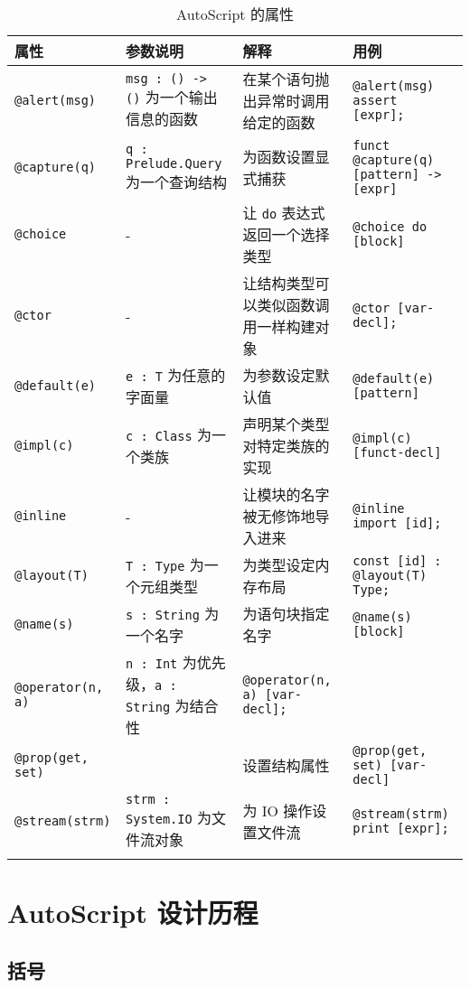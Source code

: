 \begin{longtable}{l p{4cm} p{3cm} p{4cm}} \hline
		属性 & 参数说明 & 解释 & 用例 \\\hline
		\lstinline!@alert(msg)! & \lstinline!msg : () -> ()! 为一个输出信息的函数 & 在某个语句抛出异常时调用给定的函数 & \lstinline!@alert(msg) assert [expr];! \\\hline
		\lstinline!@capture(q)! & \lstinline!q : Prelude.Query! 为一个查询结构 & 为函数设置显式捕获 & \lstinline!funct @capture(q) [pattern] -> [expr]! \\\hline
		\lstinline!@choice! & - & 让 \lstinline!do! 表达式返回一个选择类型 & \lstinline!@choice do [block]! \\\hline
		\lstinline!@ctor! & - & 让结构类型可以类似函数调用一样构建对象 & \lstinline!@ctor [var-decl];! \\\hline
		\lstinline!@default(e)! & \lstinline!e : T! 为任意的字面量 & 为参数设定默认值 & \lstinline!@default(e) [pattern]! \\\hline
		\lstinline!@impl(c)! & \lstinline!c : Class! 为一个类族 & 声明某个类型对特定类族的实现 & \lstinline!@impl(c) [funct-decl]! \\\hline
		\lstinline!@inline! & - & 让模块的名字被无修饰地导入进来 & \lstinline!@inline import [id];! \\\hline
		\lstinline!@layout(T)! & \lstinline!T : Type! 为一个元组类型 & 为类型设定内存布局 & \lstinline!const [id] : @layout(T) Type;! \\\hline
		\lstinline!@name(s)! & \lstinline!s : String! 为一个名字 & 为语句块指定名字 & \lstinline!@name(s) [block]!  \\\hline
		\lstinline!@operator(n, a)! & \lstinline!n : Int! 为优先级，\lstinline!a : String! 为结合性 & \lstinline!@operator(n, a) [var-decl];! \\\hline
		\lstinline!@prop(get, set)! & \lstinline!! & 设置结构属性 & \lstinline!@prop(get, set) [var-decl]! \\\hline
		\lstinline!@stream(strm)! & \lstinline!strm : System.IO! 为文件流对象 & 为 IO 操作设置文件流 & \lstinline!@stream(strm) print [expr];! \\\hline
	\caption{AutoScript 的属性}
	\label{tab:attributes}
\end{longtable}


\chapter{AutoScript 设计历程}

\section{括号}

